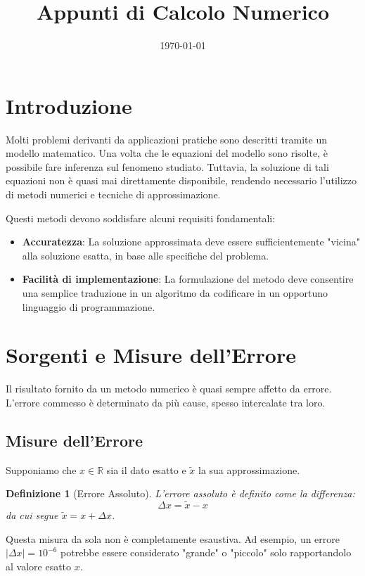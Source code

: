\documentclass{article}
\title{Appunti di Calcolo Numerico}
\author{} %
\date{\today}
\newtheorem{definition}{Definizione}[section]
\begin{document}
\maketitle

\section*{Introduzione}

Molti problemi derivanti da applicazioni pratiche sono descritti tramite un modello matematico. Una volta che le equazioni del modello sono risolte, è possibile fare inferenza sul fenomeno studiato. Tuttavia, la soluzione di tali equazioni non è quasi mai direttamente disponibile, rendendo necessario l'utilizzo di metodi numerici e tecniche di approssimazione.

Questi metodi devono soddisfare alcuni requisiti fondamentali:
\begin{itemize}
    \item \textbf{Accuratezza}: La soluzione approssimata deve essere sufficientemente "vicina" alla soluzione esatta, in base alle specifiche del problema.
    \item \textbf{Facilità di implementazione}: La formulazione del metodo deve consentire una semplice traduzione in un algoritmo da codificare in un opportuno linguaggio di programmazione.
\end{itemize}

\section{Sorgenti e Misure dell'Errore}

Il risultato fornito da un metodo numerico è quasi sempre affetto da errore. L'errore commesso è determinato da più cause, spesso intercalate tra loro.

\subsection{Misure dell'Errore}
Supponiamo che $x \in \mathbb{R}$ sia il dato esatto e $\tilde{x}$ la sua approssimazione.

\begin{definition}[Errore Assoluto]
L'errore assoluto è definito come la differenza:
$$ \Delta x = \tilde{x} - x $$
da cui segue $\tilde{x} = x + \Delta x$.
\end{definition}

Questa misura da sola non è completamente esaustiva. Ad esempio, un errore $|\Delta x| = 10^{-6}$ potrebbe essere considerato "grande" o "piccolo" solo rapportandolo al valore esatto $x$.
\end{document}
